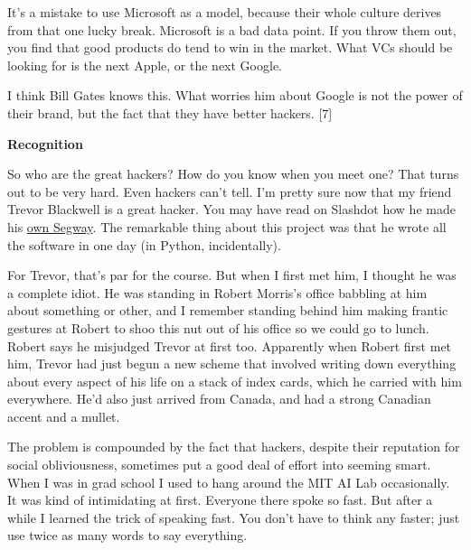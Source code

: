 It's a mistake to use Microsoft as a
                    model, because their whole culture derives from that one
                    lucky break. Microsoft is a bad data point. If you throw
                    them out, you find that good products do tend to win in the
                    market. What VCs should be looking for is the next Apple, or
                    the next Google.

I think Bill Gates knows this.
                    What worries him about Google is not the power of their
                    brand, but the fact that they have better hackers. [7]


                    \textbf{Recognition}

So who are the great hackers?
                    How do you know when you meet one? That turns out to be very
                    hard. Even hackers can't tell. I'm pretty sure now that my
                    friend Trevor Blackwell is a great hacker. You may have read
                    on Slashdot how he made his
                    \href{http://www.tlb.org/scooter.html}{own Segway}.
                    The remarkable thing about this project was that he wrote
                    all the software in one day (in Python, incidentally).

For
                    Trevor, that's par for the course. But when I first met him,
                    I thought he was a complete idiot. He was standing in Robert
                    Morris's office babbling at him about something or other,
                    and I remember standing behind him making frantic gestures
                    at Robert to shoo this nut out of his office so we could go
                    to lunch. Robert says he misjudged Trevor at first too.
                    Apparently when Robert first met him, Trevor had just begun
                    a new scheme that involved writing down everything about
                    every aspect of his life on a stack of index cards, which he
                    carried with him everywhere. He'd also just arrived from
                    Canada, and had a strong Canadian accent and a mullet.

The
                    problem is compounded by the fact that hackers, despite
                    their reputation for social obliviousness, sometimes put a
                    good deal of effort into seeming smart. When I was in grad
                    school I used to hang around the MIT AI Lab occasionally. It
                    was kind of intimidating at first. Everyone there spoke so
                    fast. But after a while I learned the trick of speaking
                    fast. You don't have to think any faster; just use twice as
                    many words to say everything.
                    

